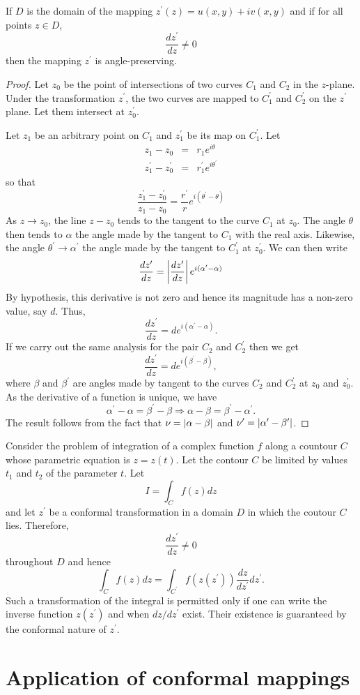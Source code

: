 \begin{thm}\label{c3s1t1}
If $D$ is the domain of the mapping $z^\prime(z) = u(x,y) + iv(x,y)$ and if
for all points $z \in D$,
\[
\frac{dz^\prime}{dz} \ne 0
\]
then the mapping $z^\prime$ is angle-preserving.
\end{thm}
\begin{proof}
Let $z_0$ be the point of intersections of two curves $C_1$ and $C_2$ in the
$z$-plane. Under the transformation $z^\prime$, the two curves are mapped to
$C_1^\prime$ and $C_2^\prime$ on the $z^\prime$ plane. Let them intersect at
$z_0^\prime$.

Let $z_1$ be an arbitrary point on $C_1$ and $z_1^\prime$ be its map on 
$C_1^\prime$. Let
\begin{eqnarray*}
z_1 - z_0 &=& r_1e^{i\theta} \\
z_1^\prime - z_0^\prime &=& r_1^\prime e^{i\theta^\prime} 
\end{eqnarray*}
so that
\[
\frac{z_1^\prime - z_0^\prime}{z_1 - z_0} = 
\frac{r^\prime}{r}e^{i(\theta^\prime- \theta)}
\]
As $z \rightarrow z_0$, the line $z - z_0$ tends to the tangent to the curve
$C_1$ at $z_0$. The angle $\theta$ then tends to $\alpha$ the angle made by
the tangent to $C_1$ with the real axis. Likewise, the angle $\theta^\prime
\rightarrow \alpha^\prime$ the angle made by the tangent to $C_1^\prime$ at
$z_0^\prime$. We can then write
\[
\frac{dz^\prime}{dz} = \left\vert{\frac{dz^\prime}{dz}}\right\vert e^{i(\alpha^\prime - \alpha)}
\]
By hypothesis, this derivative is not zero and hence its magnitude has a 
non-zero value, say $d$. Thus,
\[
\frac{dz^\prime}{dz} = de^{i(\alpha^\prime - \alpha)}.
\]
If we carry out the same analysis for the pair $C_2$ and $C_2^\prime$ then we
get
\[
\frac{dz^\prime}{dz} = de^{i(\beta^\prime - \beta)},
\]
where $\beta$ and $\beta^\prime$ are angles made by tangent to the curves
$C_2$ and $C_2^\prime$ at $z_0$ and $z_0^\prime$. As the derivative of a
function is unique, we have
\[
\alpha^\prime - \alpha = \beta^\prime - \beta \Rightarrow \alpha - \beta = 
\beta^\prime - \alpha^\prime.
\] 
The result follows from the fact that $\nu = \left\vert{\alpha - \beta}\right\vert$ and 
$\nu^\prime = \left\vert{\alpha^\prime - \beta^\prime}\right\vert$.
\end{proof}

Consider the problem of integration of a complex function $f$ along a countour
$C$ whose parametric equation is $z = z(t)$. Let the contour $C$ be limited
by values $t_1$ and $t_2$ of the parameter $t$. Let
\[
I = \int_C f(z)dz
\]
and let $z^\prime$ be a conformal transformation in a domain $D$ in which the
coutour $C$ lies. Therefore,
\[
\frac{dz^\prime}{dz} \ne 0
\]
throughout $D$ and hence
\[
\int_C f(z)dz = \int_{C^\prime}f(z(z^\prime))\frac{dz}{dz^\prime}dz^\prime.
\]
Such a transformation of the integral is permitted only if one can write the
inverse function $z(z^\prime)$ and when $dz/dz^\prime$ exist. Their existence
is guaranteed by the conformal nature of $z^\prime$.

\section{Application of conformal mappings}\label{c3s2}
